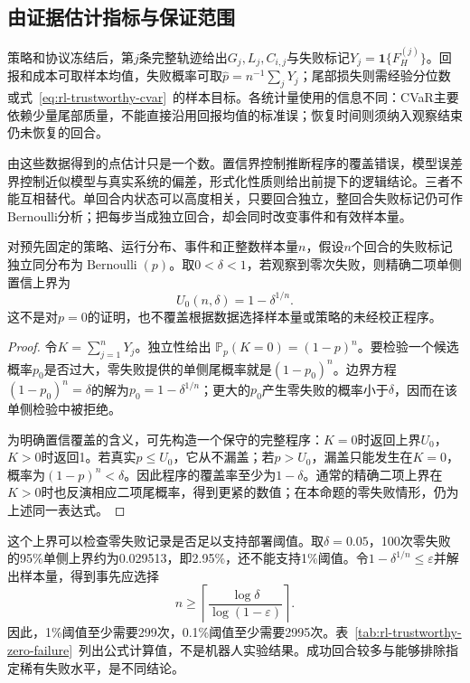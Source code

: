 \subsection{由证据估计指标与保证范围}
\label{sec:rl-trustworthy-inference}

策略和协议冻结后，第$j$条完整轨迹给出$G_j,L_j,C_{i,j}$与失败标记$Y_j=\mathbf1\{F_H^{(j)}\}$。回报和成本可取样本均值，失败概率可取$\widehat p=n^{-1}\sum_jY_j$；尾部损失则需经验分位数或式~\eqref{eq:rl-trustworthy-cvar}~的样本目标。各统计量使用的信息不同：CVaR主要依赖少量尾部质量，不能直接沿用回报均值的标准误；恢复时间则须纳入观察结束仍未恢复的回合。

由这些数据得到的点估计只是一个数。置信界控制推断程序的覆盖错误，模型误差界控制近似模型与真实系统的偏差，形式化性质则给出前提下的逻辑结论。三者不能互相替代。单回合内状态可以高度相关，只要回合独立，整回合失败标记仍可作Bernoulli分析；把每步当成独立回合，却会同时改变事件和有效样本量。

\begin{theorem}[零失败记录的单侧上界]
  \label{thm:rl-trustworthy-zero-failure}
  对预先固定的策略、运行分布、事件和正整数样本量$n$，假设$n$个回合的失败标记独立同分布为$\operatorname{Bernoulli}(p)$。取$0<\delta<1$，若观察到零次失败，则精确二项单侧置信上界为
  \[
    U_0(n,\delta)=1-\delta^{1/n}.
  \]
  这不是对$p=0$的证明，也不覆盖根据数据选择样本量或策略的未经校正程序。
\end{theorem}
\begin{proof}
  令$K=\sum_{j=1}^nY_j$。独立性给出
  $\mathbb P_p(K=0)=(1-p)^n$。要检验一个候选概率$p_0$是否过大，零失败提供的单侧尾概率就是$(1-p_0)^n$。边界方程
  $(1-p_0)^n=\delta$的解为$p_0=1-\delta^{1/n}$；更大的$p_0$产生零失败的概率小于$\delta$，因而在该单侧检验中被拒绝。

  为明确置信覆盖的含义，可先构造一个保守的完整程序：$K=0$时返回上界$U_0$，$K>0$时返回1。若真实$p\leq U_0$，它从不漏盖；若$p>U_0$，漏盖只能发生在$K=0$，概率为$(1-p)^n<\delta$。因此程序的覆盖率至少为$1-\delta$。通常的精确二项上界在$K>0$时也反演相应二项尾概率，得到更紧的数值；在本命题的零失败情形，仍为上述同一表达式。
\end{proof}

这个上界可以检查零失败记录是否足以支持部署阈值。取$\delta=0.05$，100次零失败的95\%单侧上界约为0.029513，即2.95\%，还不能支持1\%阈值。令$1-\delta^{1/n}\leq\varepsilon$并解出样本量，得到事先应选择
\[
  n\geq
  \left\lceil\frac{\log\delta}{\log(1-\varepsilon)}\right\rceil.
\]
因此，1\%阈值至少需要299次，0.1\%阈值至少需要2995次。表~\ref{tab:rl-trustworthy-zero-failure}~列出公式计算值，不是机器人实验结果。成功回合较多与能够排除指定稀有失败水平，是不同结论。

